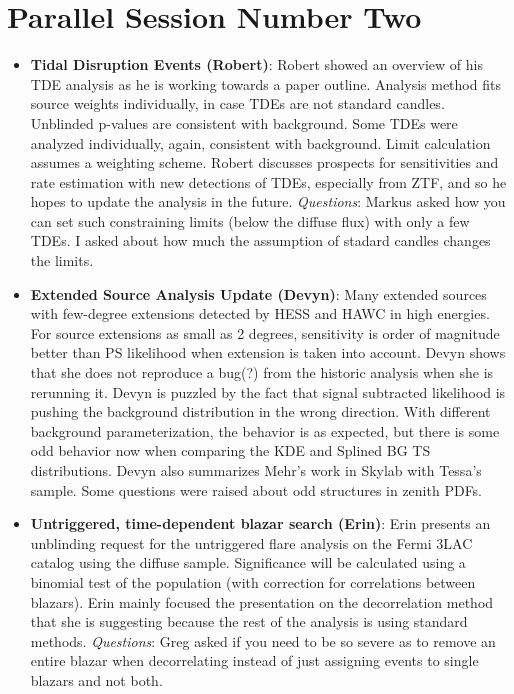 \section{Parallel Session Number Two}
\begin{itemize}
    \item \textbf{Tidal Disruption Events (Robert)}: Robert showed an overview of his TDE analysis as he is working towards a paper outline. Analysis method fits source weights individually, in case TDEs are not standard candles. Unblinded p-values are consistent with background. Some TDEs were analyzed individually, again, consistent with background. Limit calculation assumes a weighting scheme. Robert discusses prospects for sensitivities and rate estimation with new detections of TDEs, especially from ZTF, and so he hopes to update the analysis in the future. \emph{Questions}: Markus asked how you can set such constraining limits (below the diffuse flux) with only a few TDEs. I asked about how much the assumption of stadard candles changes the limits.
    \item \textbf{Extended Source Analysis Update (Devyn)}: Many extended sources with few-degree extensions detected by HESS and HAWC in high energies. For source extensions as small as 2 degrees, sensitivity is order of magnitude better than PS likelihood when extension is taken into account. Devyn shows that she does not reproduce a bug(?) from the historic analysis when she is rerunning it. Devyn is puzzled by the fact that signal subtracted likelihood is pushing the background distribution in the wrong direction. With different background parameterization, the behavior is as expected, but there is some odd behavior now when comparing the KDE and Splined BG TS distributions. Devyn also summarizes Mehr's work in Skylab with Tessa's sample. Some questions were raised about odd structures in zenith PDFs. 
    \item \textbf{Untriggered, time-dependent blazar search (Erin)}: Erin presents an unblinding request for the untriggered flare analysis on the Fermi 3LAC catalog using the diffuse sample. Significance will be calculated using a binomial test of the population (with correction for correlations between blazars). Erin mainly focused the presentation on the decorrelation method that she is suggesting because the rest of the analysis is using standard methods. \emph{Questions}: Greg asked if you need to be so severe as to remove an entire blazar when decorrelating instead of just assigning events to single blazars and not both.

\end{itemize}
